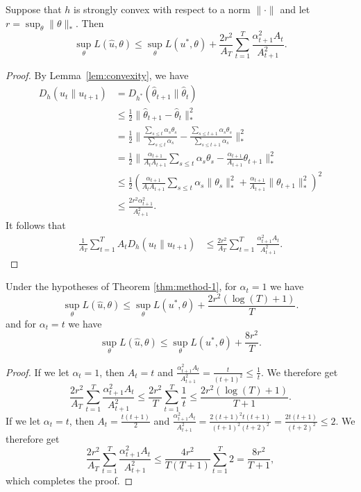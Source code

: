 \documentclass[paper.tex]{subfiles}
\begin{document}
\begin{theorem}
\label{thm:method-1}
Suppose that $h$ is strongly convex with respect to a norm $\|\cdot\|$ 
and let $r = \sup_{\theta} \|\theta\|_{*}$. Then 
\[ \sup_{\theta} L(\hat{u}, \theta) \leq \sup_{\theta} L(u^*, \theta) + \frac{2r^2}{A_T} \sum_{t=1}^T \frac{\alpha_{t+1}^2A_t}{A_{t+1}^2}. \]
\end{theorem}
\begin{proof}
By Lemma~\ref{lem:convexity}, we have 
\begin{align*}
D_h(u_t \| u_{t+1}) &= D_{h^*}(\hat{\theta}_{t+1} \| \hat{\theta}_{t}) \\
 &\leq \frac{1}{2}\|\hat\theta_{t+1}-\hat\theta_{t}\|_{*}^2 \\
 &= \frac{1}{2}\|\frac{\sum_{s \leq t}\alpha_s\theta_s}{\sum_{s \leq t} \alpha_s} - \frac{\sum_{s \leq t+1}\alpha_s\theta_s}{\sum_{s \leq t+1} \alpha_s}\|_{*}^2 \\
 &= \frac{1}{2}\|\frac{\alpha_{t+1}}{A_tA_{t+1}} \sum_{s \leq t} \alpha_s\theta_s - \frac{\alpha_{t+1}}{A_{t+1}} \theta_{t+1}\|_{*}^2 \\
 &\leq \frac{1}{2} \left(\frac{\alpha_{t+1}}{A_tA_{t+1}} \sum_{s \leq t} \alpha_s\|\theta_s\|_{*}^2 + \frac{\alpha_{t+1}}{A_{t+1}} \|\theta_{t+1}\|_{*}^2\right)^2 \\
 &\leq \frac{2r^2\alpha_{t+1}^2}{A_{t+1}^2}.
\end{align*}
It follows that 
\begin{align*}
\frac{1}{A_T} \sum_{t=1}^T A_tD_h(u_t \| u_{t+1}) &\leq \frac{2r^2}{A_T} \sum_{t=1}^T \frac{\alpha_{t+1}^2A_t}{A_{t+1}^2}.
\end{align*}
\end{proof}

\begin{corollary} 
\label{cor:method-1}
Under the hypotheses of Theorem \ref{thm:method-1}, for $\alpha_{t} = 1$ we have
\[ \sup_{\theta} L(\hat{u}, \theta) \leq \sup_{\theta} L(u^*, \theta) + \frac{2r^2 (\log (T) + 1)}{T}. \]
and for $\alpha_t = t$ we have
\[ \sup_{\theta} L(\hat{u}, \theta) \leq \sup_{\theta} L(u^*, \theta) + \frac{8r^2}{T}. \]
\end{corollary}
\begin{proof}
If we let $\alpha_t = 1$, then $A_t = t$ and $\frac{\alpha_{t+1}^2A_t}{A_{t+1}^2} = \frac{t}{(t+1)^{2}} \le \frac{1}{t}$.
We therefore get
\begin{equation}
\frac{2r^2}{A_T} \sum_{t=1}^T \frac{\alpha_{t+1}^2A_t}{A_{t+1}^2} \leq \frac{2r^2}{T} \sum_{t=1}^{T}\frac{1}{t} \leq \frac{2r^2(\log (T) + 1)}{T+1}.
\end{equation}
If we let $\alpha_t = t$, then $A_t = \frac{t(t+1)}{2}$ and 
$\frac{\alpha_{t+1}^2A_t}{A_{t+1}^2} = \frac{2(t+1)^2t(t+1)}{(t+1)^2(t+2)^2} = \frac{2t(t+1)}{(t+2)^2} \leq 2$.
We therefore get
\begin{equation}
\frac{2r^2}{A_T} \sum_{t=1}^T \frac{\alpha_{t+1}^2A_t}{A_{t+1}^2} \leq \frac{4r^2}{T(T+1)} \sum_{t=1}^{T}2 = \frac{8r^2}{T+1},
\end{equation}
which completes the proof.
\end{proof}
\end{document}
